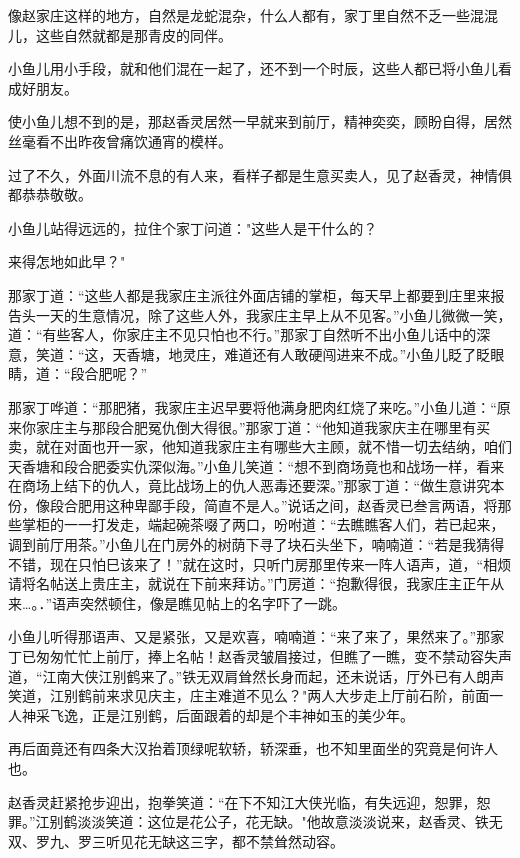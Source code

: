\documentclass[12pt,oneside]{book}
\begin{document}
像赵家庄这样的地方，自然是龙蛇混杂，什么人都有，家丁里自然不乏一些混混儿，这些自然就都是那青皮的同伴。

小鱼儿用小手段，就和他们混在一起了，还不到一个时辰，这些人都已将小鱼儿看成好朋友。

使小鱼儿想不到的是，那赵香灵居然一早就来到前厅，精神奕奕，顾盼自得，居然丝毫看不出昨夜曾痛饮通宵的模样。

过了不久，外面川流不息的有人来，看样子都是生意买卖人，见了赵香灵，神情俱都恭恭敬敬。

小鱼儿站得远远的，拉住个家丁问道："这些人是干什么的？

来得怎地如此早？"

那家丁道：``这些人都是我家庄主派往外面店铺的掌柜，每天早上都要到庄里来报告头一天的生意情况，除了这些人外，我家庄主早上从不见客。''小鱼儿微微一笑，道：``有些客人，你家庄主不见只怕也不行。''那家丁自然听不出小鱼儿话中的深意，笑道：``这，天香塘，地灵庄，难道还有人敢硬闯进来不成。''小鱼儿眨了眨眼睛，道：``段合肥呢？''

那家丁哗道：``那肥猪，我家庄主迟早要将他满身肥肉红烧了来吃。''小鱼儿道：``原来你家庄主与那段合肥冤仇倒大得很。''那家丁道：``他知道我家庆主在哪里有买卖，就在对面也开一家，他知道我家庄主有哪些大主顾，就不惜一切去结纳，咱们天香塘和段合肥委实仇深似海。''小鱼儿笑道：``想不到商场竟也和战场一样，看来在商场上结下的仇人，竟比战场上的仇人恶毒还要深。''那家丁道：``做生意讲究本份，像段合肥用这种卑鄙手段，简直不是人。''说话之间，赵香灵已叁言两语，将那些掌柜的一一打发走，端起碗茶啜了两口，吩咐道：``去瞧瞧客人们，若已起来，调到前厅用茶。''小鱼儿在门房外的树荫下寻了块石头坐下，喃喃道：``若是我猜得不错，现在只怕巳该来了！''就在这时，只听门房那里传来一阵人语声，道，``相烦请将名帖送上贵庄主，就说在下前来拜访。''门房道：``抱歉得很，我家庄主正午从来\ldots。．''语声突然顿住，像是瞧见帖上的名字吓了一跳。

小鱼儿听得那语声、又是紧张，又是欢喜，喃喃道：``来了来了，果然来了。''那家丁已匆匆忙忙上前厅，捧上名帖！赵香灵皱眉接过，但瞧了一瞧，变不禁动容失声道，``江南大侠江别鹤来了。''铁无双肩耸然长身而起，还未说话，厅外已有人朗声笑道，江别鹤前来求见庆主，庄主难道不见么？"两人大步走上厅前石阶，前面一人神采飞逸，正是江别鹤，后面跟着的却是个丰神如玉的美少年。

再后面竟还有四条大汉抬着顶绿呢软轿，轿深垂，也不知里面坐的究竟是何许人也。

赵香灵赶紧抢步迎出，抱拳笑道：``在下不知江大侠光临，有失远迎，恕罪，恕罪。''江别鹤淡淡笑道：这位是花公子，花无缺。"他故意淡淡说来，赵香灵、铁无双、罗九、罗三听见花无缺这三字，都不禁耸然动容。
\end{document}
